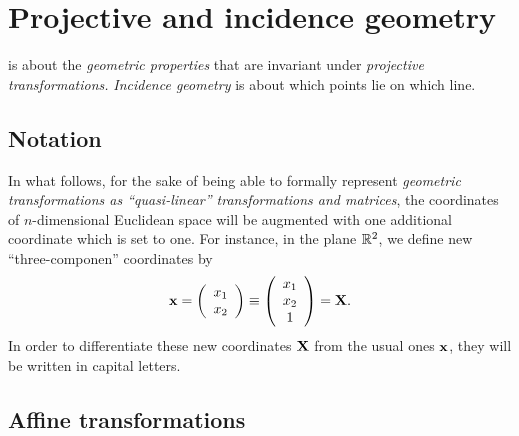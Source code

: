 \chapter{Projective and incidence geometry}
\label{2012-m-ch-projgeom}

 is about the {\em geometric properties} that are invariant under
{\em projective transformations.}
{\em Incidence geometry} is about which points lie on which line.

\section{Notation}
In what follows, for the sake of being able to formally represent {\em geometric transformations as
``quasi-linear'' transformations and matrices},
the coordinates of $n$-dimensional Euclidean space will be augmented with one additional coordinate
which is set to one.
For instance, in the plane ${\Bbb R}^2$, we define new ``three-componen'' coordinates by
\begin{equation}
{\bf x} =
\left(
\begin{array}{c}
x_1\\
x_2
\end{array}
\right)
\equiv
\left(
\begin{array}{c}
x_1\\
x_2 \\
1
\end{array}
\right) =  {\bf X}
.
\end{equation}
In order to differentiate these new coordinates ${\bf X}$
from the usual ones ${\bf x}$, they will be written in capital letters.



\section{Affine transformations}

